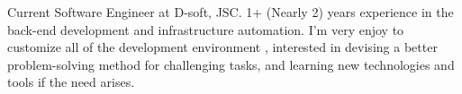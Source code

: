 

\begin{cvparagraph}

Current Software Engineer at D-soft, JSC. 1+ (Nearly 2) years experience in the back-end development and infrastructure
automation. I'm very enjoy to customize all of the development environment , interested in devising a better problem-solving
method for challenging tasks, and learning new technologies and tools if the need arises.

\end{cvparagraph}
